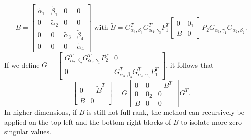 \documentclass[11pt]{article}
\begin{document}
	\begin{equation*}
	B=\begin{bmatrix}
		\widetilde{\alpha}_1&\widetilde{\beta}_1&0&0\\
		0&\widetilde{\alpha}_2&0&0\\
		0&0&\widetilde{\alpha}_3&\widetilde{\beta}_4\\
		0&0&0&\widetilde{\alpha}_4
		\end{bmatrix} \text{ with } \widetilde{B} = G_{\alpha_3,\beta_3}^TG_{\alpha_4,\gamma_3}^TP_1^T  \begin{bmatrix}0&0_1\\
		B&0\end{bmatrix} P_2 G_{\alpha_1,\gamma_1} G_{\alpha_2,\beta_2}.
	\end{equation*}
	If we define $G = \begin{bmatrix}
	G_{\alpha_2,\beta_2}^TG_{\alpha_1,\gamma_1}^TP_2^T&0\\
	0&G_{\alpha_3,\beta_3}^TG_{\alpha_4,\gamma_3}^TP_1^T
	\end{bmatrix}$, it follows that \begin{equation}
	\begin{bmatrix}0&-\widetilde{B}^T\\
	 \widetilde{B}&0\end{bmatrix} = G\begin{bmatrix}0&0&-B^T\\0&0_2&0\\ B&0&0\end{bmatrix}G^T.
	\end{equation}
	In higher dimensions, if $B$ is still not full rank, the method can recursively be applied on the top left and the bottom right blocks of $B$ to isolate more zero singular values.
	
	
	
\end{document}
